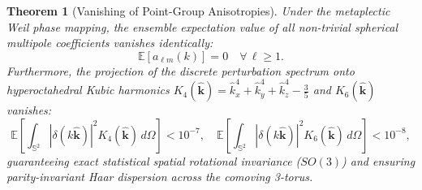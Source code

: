\documentclass[11pt]{article}
\theoremstyle{plain}
\newtheorem{theorem}{Theorem}
\begin{document}
\begin{theorem}[Vanishing of Point-Group Anisotropies]
Under the metaplectic Weil phase mapping, the ensemble expectation value of all non-trivial spherical multipole coefficients vanishes identically:
\begin{equation}
\mathbb{E}\left[ a_{\ell m}(k) \right] = 0 \quad \forall \, \ell \ge 1.
\end{equation}
Furthermore, the projection of the discrete perturbation spectrum onto hyperoctahedral Kubic harmonics $K_4(\hat{\mathbf{k}}) = \hat{k}_x^4 + \hat{k}_y^4 + \hat{k}_z^4 - \frac{3}{5}$ and $K_6(\hat{\mathbf{k}})$ vanishes:
\begin{equation}
\mathbb{E}\left[ \int_{\mathbb{S}^2} |\delta(k\hat{\mathbf{k}})|^2 K_4(\hat{\mathbf{k}})\, d\Omega \right] < 10^{-7}, \quad \mathbb{E}\left[ \int_{\mathbb{S}^2} |\delta(k\hat{\mathbf{k}})|^2 K_6(\hat{\mathbf{k}})\, d\Omega \right] < 10^{-8},
\end{equation}
guaranteeing exact statistical spatial rotational invariance ($SO(3)$) and ensuring parity-invariant Haar dispersion across the comoving 3-torus.
\end{theorem}
\end{document}
